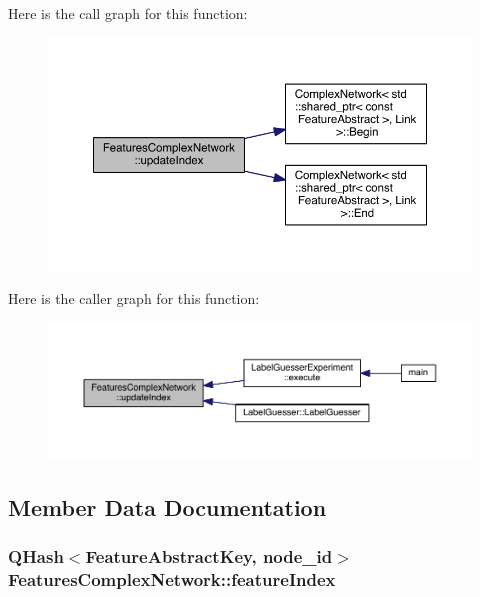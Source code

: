 Here is the call graph for this function\+:\nopagebreak
\begin{figure}[H]
\begin{center}
\leavevmode
\includegraphics[width=350pt]{class_features_complex_network_a8e1b87e9664a72c2062aae67bad94261_cgraph}
\end{center}
\end{figure}




Here is the caller graph for this function\+:\nopagebreak
\begin{figure}[H]
\begin{center}
\leavevmode
\includegraphics[width=350pt]{class_features_complex_network_a8e1b87e9664a72c2062aae67bad94261_icgraph}
\end{center}
\end{figure}




\subsection{Member Data Documentation}
\hypertarget{class_features_complex_network_a0ae97c0bad2fcba543df55522c46242e}{
\subsubsection[{feature\+Index}]{\setlength{\rightskip}{0pt plus 5cm}Q\+Hash$<${\bf Feature\+Abstract\+Key}, {\bf node\+\_\+id}$>$ Features\+Complex\+Network\+::feature\+Index\hspace{0.3cm}{\ttfamily [private]}}}\label{class_features_complex_network_a0ae97c0bad2fcba543df55522c46242e}


